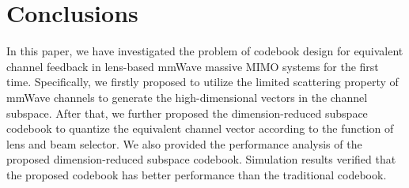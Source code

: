 \documentclass[10pt,twocolumn,twoside]{IEEEtran}
\begin{document}
\section{Conclusions}\label{S5}
In this paper, we have investigated the problem of codebook design for equivalent channel feedback in lens-based mmWave massive MIMO systems for the first time.
Specifically, we firstly proposed to utilize the limited scattering property of mmWave channels to generate the high-dimensional vectors in the channel subspace.
After that, we further proposed the dimension-reduced subspace codebook to quantize the equivalent channel vector according to the function of lens and beam selector.
We also provided the performance analysis of the proposed dimension-reduced subspace codebook.
Simulation results verified that the proposed codebook has better performance than the traditional codebook.



\end{document}
